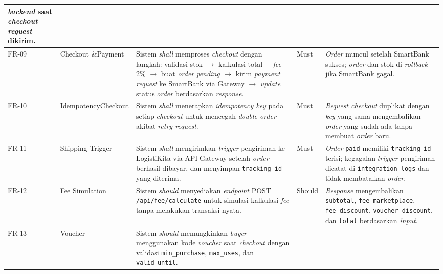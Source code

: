 \begin{longtable}{|L{0.9cm}|L{2.7cm}|L{5.5cm}|L{1.3cm}|L{4.6cm}|}
          \textit{backend} saat \textit{checkout request} dikirim. \\
    \hline
    FR-09
        & Checkout \&\newline Payment
        & Sistem \textit{shall} memproses \textit{checkout} dengan langkah:
          validasi stok $\rightarrow$ kalkulasi total + \textit{fee} 2\%
          $\rightarrow$ buat \textit{order pending} $\rightarrow$ kirim
          \textit{payment request} ke SmartBank via Gateway $\rightarrow$
          \textit{update} status \textit{order} berdasarkan \textit{response}.
        & Must
        & \textit{Order}  muncul setelah SmartBank sukses;
          \textit{order}  dan stok di-\textit{rollback}
          jika SmartBank gagal. \\
    \hline
    FR-10
        & Idempotency\newline Checkout
        & Sistem \textit{shall} menerapkan \textit{idempotency key} pada setiap
          \textit{checkout} untuk mencegah \textit{double order} akibat
          \textit{retry request}.
        & Must
        & \textit{Request checkout} duplikat dengan \textit{key} yang sama
          mengembalikan \textit{order} yang sudah ada tanpa membuat \textit{order}
          baru. \\
    \hline
    FR-11
        & Shipping Trigger
        & Sistem \textit{shall} mengirimkan \textit{trigger} pengiriman ke
          LogistiKita via API Gateway setelah \textit{order} berhasil dibayar, dan
          menyimpan \texttt{tracking\_id} yang diterima.
        & Must
        & \textit{Order} \texttt{paid} memiliki \texttt{tracking\_id} terisi;
          kegagalan \textit{trigger} pengiriman dicatat di \texttt{integration\_logs}
          dan tidak membatalkan \textit{order}. \\
    \hline
    FR-12
        & Fee Simulation
        & Sistem \textit{should} menyediakan \textit{endpoint} POST
          \texttt{/api/fee/calculate} untuk simulasi kalkulasi \textit{fee} tanpa
          melakukan transaksi nyata.
        & Should
        & \textit{Response} mengembalikan \texttt{subtotal},
          \texttt{fee\_marketplace}, \texttt{fee\_discount},
          \texttt{voucher\_discount}, dan \texttt{total} berdasarkan \textit{input}. \\
    \hline
    FR-13
        & Voucher
        & Sistem \textit{should} memungkinkan \textit{buyer} menggunakan kode
          \textit{voucher} saat \textit{checkout} dengan validasi
          \texttt{min\_purchase}, \texttt{max\_uses}, dan \texttt{valid\_until}.

\end{longtable}
